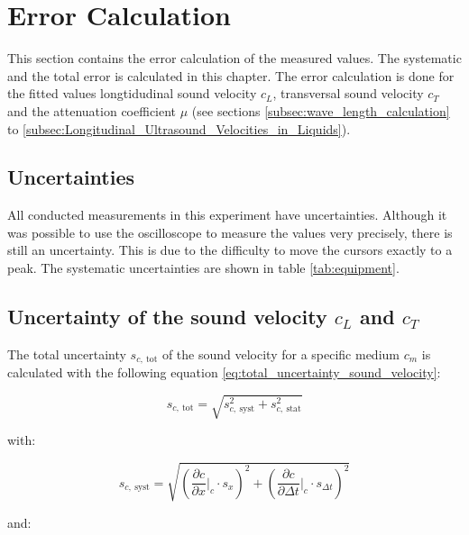 \section{Error Calculation}
\label{sec:Error_Calculation}
This section contains the error calculation of the measured values. The systematic and the total error is calculated in this chapter. The error calculation is done for the fitted values longtidudinal sound velocity $c_L$, transversal sound velocity $c_T$ and the attenuation coefficient $\mu$ (see sections \ref{subsec:wave_length_calculation} to \ref{subsec:Longitudinal_Ultrasound_Velocities_in_Liquids}).

\subsection{Uncertainties}
\label{subsec:Uncertainties}
All conducted measurements in this experiment have uncertainties. Although it was possible to use the oscilloscope to measure the values very precisely, there is still an uncertainty. This is due to the difficulty to move the cursors exactly to a peak. The systematic uncertainties are shown in table \ref{tab:equipment}.

\subsection{Uncertainty of the sound velocity $c_L$ and $c_T$}
\label{subsec:Uncertainty_Sound_Velocity}
The total uncertainty $s_{c,\ \text{tot}}$ of the sound velocity for a specific medium $c_m$ is calculated with the following equation \ref{eq:total_uncertainty_sound_velocity}:

\begin{equation}
s_{c,\ \text{tot}}=\sqrt{s_{c,\ \text{syst}}^2+s_{c,\ \text{stat}}^2}
\label{eq:total_uncertainty_sound_velocity}
\end{equation}

with:

\begin{equation}
s_{c,\ \text{syst}}=\sqrt{\left(\frac{\partial c}{\partial x}\Biggr|_{c}\cdot s_{x}\right)^2 + \left(\frac{\partial c}{\partial \Delta t}\Biggr|_{c}\cdot s_{\Delta t}\right)^2}
\label{eq:syst_uncertainty_sound_velocity}
\end{equation}

and:

